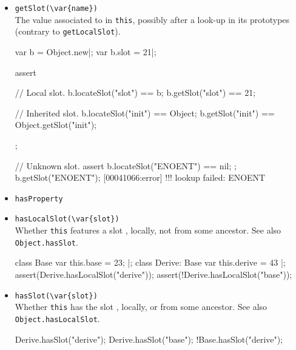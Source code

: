 \begin{itemize}
\begin{urbiscript}[firstnumber=last]
var a = Object.new|;

// Local slot.
var a.slot = 21|;
assert
{
  a.locateSlot("slot") == a;
  a.getLocalSlot("slot") == 21;
};

// Inherited slot are not looked-up.
assert { a.locateSlot("init") == Object };
a.getLocalSlot("init");
[00041066:error] !!! lookup failed: init
\end{urbiscript}

\item \lstinline|getSlot(\var{name})|\\
  The value associated to  in \lstinline|this|, possibly
  after a look-up in its prototypes (contrary to
  \lstinline|getLocalSlot|).

\begin{urbiscript}[firstnumber=last]
var b = Object.new|;
var b.slot = 21|;

assert
{
  // Local slot.
  b.locateSlot("slot") == b;
  b.getSlot("slot") == 21;

  // Inherited slot.
  b.locateSlot("init") == Object;
  b.getSlot("init") == Object.getSlot("init");
};

// Unknown slot.
assert { b.locateSlot("ENOENT") == nil; };
b.getSlot("ENOENT");
[00041066:error] !!! lookup failed: ENOENT
\end{urbiscript}

\item \lstinline|hasProperty|\\

\item \lstinline|hasLocalSlot(\var{slot})|\\
  Whether \lstinline|this| features a slot , locally, not
  from some ancestor.  See also \lstinline|Object.hasSlot|.

\begin{urbiscript}[firstnumber=last]
class Base         { var this.base = 23; } |;
class Derive: Base { var this.derive = 43 } |;
assert(Derive.hasLocalSlot("derive"));
assert(!Derive.hasLocalSlot("base"));
\end{urbiscript}

\item \lstinline|hasSlot(\var{slot})|\\
  Whether \lstinline|this| has the slot , locally, or from
  some ancestor.  See also \lstinline|Object.hasLocalSlot|.

\begin{urbiassert}[firstnumber=last]
Derive.hasSlot("derive");
Derive.hasSlot("base");
!Base.hasSlot("derive");
\end{urbiassert}


\end{itemize}
